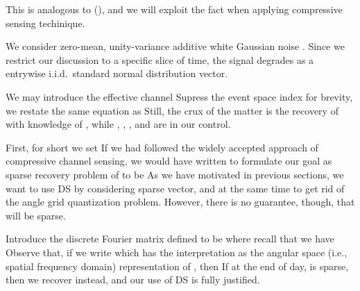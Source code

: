This is analogous to (), and we will exploit the fact when applying compressive sensing techinique.

We consider zero-mean, unity-variance additive white Gaussian noise .
Since we restrict our discussion to a specific slice of time, the signal  degrades as a entrywise i.i.d.\ standard normal distribution vector.

We may introduce the effective channel
Supress the event space index for brevity, we restate the same equation as
Still, the crux of the matter is the recovery of  with knowledge of , while , , , and  are in our control.

\stopsection
\startsection [title={Proposed Method}]
\startsubsection [title={Vectorization}]

First, for short we set
If we had followed the widely accepted approach of compressive channel sensing, we would have written
to formulate our goal as sparse recovery problem of  to be
As we have motivated in previous sections, we want to use DS by considering sparse vector, and at the same time to get rid of the angle grid quantization problem.
However, there is no guarantee, though, that  will be sparse.

\stopsubsection

\startsubsection [title={Expression for the Angular Space}]

Introduce the discrete Fourier matrix  defined to be
where recall that we have
Observe that, if we write
which has the interpretation as the angular space (i.e., spatial frequency domain) representation of , then
If at the end of day,  is sparse, then we recover  instead, and our use of DS is fully justified.

